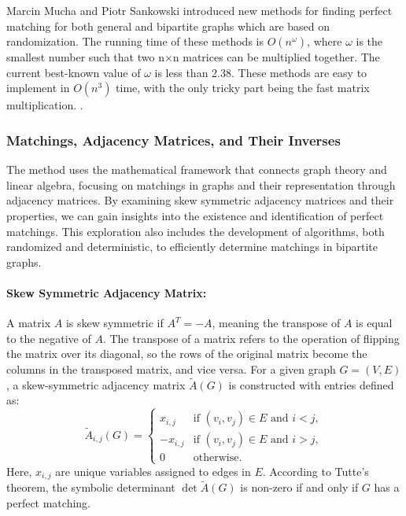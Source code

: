\label{matrix-perfect-matching}
Marcin Mucha and Piotr Sankowski introduced new methods for finding perfect matching for both general and bipartite graphs which are based on randomization. The running time of these methods is $O(n^\omega)$, where $\omega$ is the smallest number such that two n×n matrices can be multiplied together. The current best-known value of $\omega$ is less than 2.38. These methods are easy to implement in $O(n^3)$ time, with the only tricky part being the fast matrix multiplication. \cite{Mucha-Sankowski}.

\subsubsection*{Matchings, Adjacency Matrices, and Their Inverses}
The method uses the mathematical framework that connects graph theory and linear algebra, focusing on matchings in graphs and their representation through adjacency matrices. By examining skew symmetric adjacency matrices and their properties, we can gain insights into the existence and identification of perfect matchings. This exploration also includes the development of algorithms, both randomized and deterministic, to efficiently determine matchings in bipartite graphs.

\paragraph*{Skew Symmetric Adjacency Matrix:} A matrix \( A \) is skew symmetric if \( A^T = -A \), meaning the transpose of \( A \) is equal to the negative of \( A \). The transpose of a matrix refers to the operation of flipping the matrix over its diagonal, so the rows of the original matrix become the columns in the transposed matrix, and vice versa. 
\noindent For a given graph \( G = (V, E) \), a skew-symmetric adjacency matrix \( \tilde{A}(G) \) is constructed with entries defined as:
\[
\tilde{A}_{i,j}(G) =
\begin{cases} 
x_{i,j} & \text{if } (v_i, v_j) \in E \text{ and } i < j, \\
-x_{i,j} & \text{if } (v_i, v_j) \in E \text{ and } i > j, \\
0 & \text{otherwise}.
\end{cases}
\]
Here, $x_{i,j}$ are unique variables assigned to edges in $E$. According to Tutte's theorem, the symbolic determinant \( \det \tilde{A}(G) \) is non-zero if and only if $G$ has a perfect matching.

